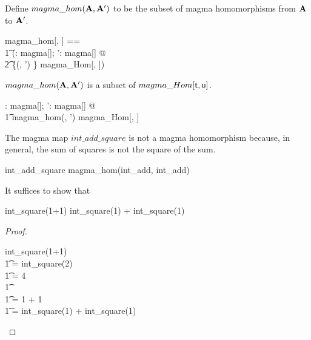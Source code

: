 \documentclass{amsart}
\begin{document}
Define $magma\_hom(\mathbf{A}, \mathbf{A}')$ to be the subset of magma homomorphisms 
from $\mathbf{A}$ to $\mathbf{A}'$.

\begin{zed}
	magma\_hom[\genT, \genU] == \\
	\t1	(\lambda \strucA: magma[\genT]; \strucA': magma[\genU] @ \\
	\t2		\{(\strucA, \strucA') \} \dres magma\_Hom[\genT, \genU])
\end{zed}

\begin{remark} $magma\_hom(\mathbf{A}, \mathbf{A}')$ is a subset of $magma\_Hom[\mathsf{t}, \mathsf{u}]$.

\begin{zed}
	\forall \strucA: magma[\setT]; \strucA': magma[\setU] @ \\
	\t1	magma\_hom(\strucA, \strucA') \subseteq magma\_Hom[\setT, \setU]
\end{zed}

\end{remark}

\begin{counterexample}
The magma map $int\_add\_square$ is not a magma homomorphism because, in general, the sum of squares
is not the square of the sum.

\begin{zed}
	int\_add\_square \notin magma\_hom(int\_add, int\_add)
\end{zed}

It suffices to show that

\begin{zed}
	int\_square(1+1) \neq int\_square(1) + int\_square(1)
\end{zed}

\begin{proof}

\begin{zed}
	int\_square(1+1) \\
	\t1	= int\_square(2) \\
	\t1	= 4 \\
	\t1	 \\
	\t1	= 1 + 1 \\
	\t1	= int\_square(1) + int\_square(1) 
\end{zed}

\end{proof}

\end{counterexample}
\end{document}
